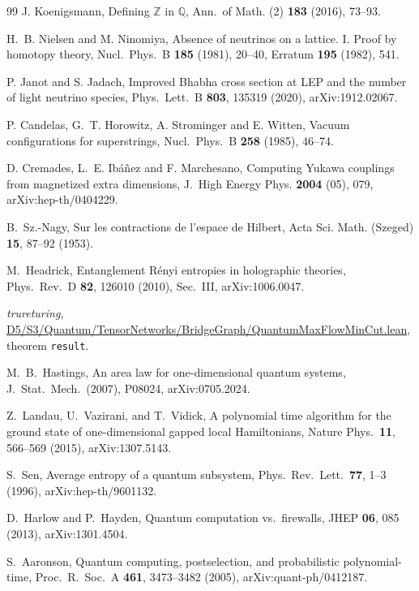 \documentclass[aps,pra,onecolumn,superscriptaddress,nofootinbib,10pt]{revtex4-2}
\theoremstyle{definition}
\theoremstyle{remark}
\begin{document}
\begin{thebibliography}{99}
 J. Koenigsmann, Defining $\mathbb Z$ in $\mathbb Q$, Ann.\ of Math. (2) \textbf{183} (2016), 73--93.

 H.~B. Nielsen and M. Ninomiya, Absence of neutrinos on a lattice. I. Proof by homotopy theory, Nucl.\ Phys.\ B \textbf{185} (1981), 20--40, Erratum \textbf{195} (1982), 541.

 P. Janot and S. Jadach, Improved Bhabha cross section at LEP and the number of light neutrino species, Phys.\ Lett.\ B \textbf{803}, 135319 (2020), arXiv:1912.02067.

 P. Candelas, G.~T. Horowitz, A. Strominger and E. Witten, Vacuum configurations for superstrings, Nucl.\ Phys.\ B \textbf{258} (1985), 46--74.

 D. Cremades, L.~E. Ib\'a\~nez and F. Marchesano, Computing Yukawa couplings from magnetized extra dimensions, J.\ High Energy Phys. \textbf{2004} (05), 079, arXiv:hep-th/0404229.

 B.~Sz.-Nagy, Sur les contractions de l'espace de Hilbert, Acta Sci. Math. (Szeged) \textbf{15}, 87--92 (1953).

 M.~Headrick, Entanglement R\'enyi entropies in holographic theories, Phys.\ Rev.\ D \textbf{82}, 126010 (2010), Sec.~III, arXiv:1006.0047.

 \emph{trureturing}, \href{https://github.com/the-omega-institute/trureturing/blob/9d18ab6b4d228a968377db110b46198742421a3d/D5/S3/Quantum/TensorNetworks/BridgeGraph/QuantumMaxFlowMinCut.lean}{D5/S3/Quantum/TensorNetworks/BridgeGraph/QuantumMaxFlowMinCut.lean}, theorem \texttt{result}.

 M.~B.~Hastings, An area law for one-dimensional quantum systems, J.\ Stat.\ Mech.\ (2007), P08024, arXiv:0705.2024.

 Z.~Landau, U.~Vazirani, and T.~Vidick, A polynomial time algorithm for the ground state of one-dimensional gapped local Hamiltonians, Nature Phys.\ \textbf{11}, 566--569 (2015), arXiv:1307.5143.

 S.~Sen, Average entropy of a quantum subsystem, Phys.\ Rev.\ Lett.\ \textbf{77}, 1--3 (1996), arXiv:hep-th/9601132.

 D.~Harlow and P.~Hayden, Quantum computation vs.\ firewalls, JHEP \textbf{06}, 085 (2013), arXiv:1301.4504.

 S.~Aaronson, Quantum computing, postselection, and probabilistic polynomial-time, Proc.\ R.\ Soc.\ A \textbf{461}, 3473--3482 (2005), arXiv:quant-ph/0412187.


\end{thebibliography}
\end{document}

